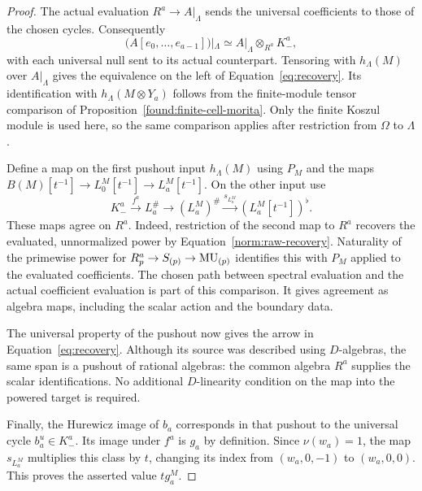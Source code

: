 \begin{proof}
The actual evaluation $R^a\to A|_\Lambda$ sends the universal
coefficients to those of the chosen cycles.  Consequently
\[
 \bigl(A[e_0,\ldots,e_{a-1}]\bigr)|_\Lambda
 \simeq A|_\Lambda\otimes_{R^a}K_-^a,
\]
with each universal null sent to its actual counterpart.  Tensoring
with $h_\Lambda(M)$ over $A|_\Lambda$ gives the equivalence on the
left of Equation~\eqref{eq:recovery}.  Its identification with
$h_\Lambda(M\otimes Y_a)$ follows from the finite-module tensor
comparison of Proposition~\ref{found:finite-cell-morita}.  Only the finite
Koszul module is used here, so the same comparison applies after
restriction from $\Omega$ to $\Lambda$.

Define a map on the first pushout input $h_\Lambda(M)$ using
$P_M$ and the maps
$B(M)[t^{-1}]\to L_0^M[t^{-1}]\to L_a^M[t^{-1}]$.
On the other input use
\[
 K_-^a\xrightarrow{f^a}L_a^\#\longrightarrow(L_a^M)^\#
        \xrightarrow{s_{L_a^M}}
                    (L_a^M[t^{-1}])^\flat.
\]
These maps agree on $R^a$.  Indeed, restriction of the second map
to $R^a$ recovers the evaluated, unnormalized power by
Equation~\eqref{norm:raw-recovery}.  Naturality of the primewise
power for $R_p^a\to S_{(p)}\to\mathrm{MU}_{(p)}$ identifies this with
$P_M$ applied to the evaluated coefficients.  The chosen path
between spectral evaluation and the actual coefficient evaluation
is part of this comparison.  It gives agreement as algebra maps,
including the scalar action and the boundary data.

The universal property of the pushout now gives the arrow in
Equation~\eqref{eq:recovery}.  Although its source was described
using $D$-algebras, the same span is a pushout of rational algebras:
the common algebra $R^a$ supplies the scalar identifications.  No
additional $D$-linearity condition on the map into the powered
target is required.

Finally, the Hurewicz image of $b_a$ corresponds in that pushout to
the universal cycle $b_a^u\in K_-^a$.  Its image under $f^a$ is
$g_a$ by definition.  Since $\nu(w_a)=1$, the map
$s_{L_a^M}$ multiplies this class by $t$, changing its index from
$(w_a,0,-1)$ to $(w_a,0,0)$.  This proves the asserted value
$t g_a^M$.
\end{proof}
